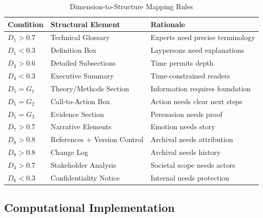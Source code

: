 \begin{table}[htbp]
\centering
\caption{Dimension-to-Structure Mapping Rules}
\label{tab:structure-rules}
\renewcommand{\arraystretch}{1.3}
\begin{tabular}{@{}lll@{}}
\toprule
\textbf{Condition} & \textbf{Structural Element} & \textbf{Rationale} \\
\midrule
$D_1 > 0.7$ & Technical Glossary & Experts need precise terminology \\
$D_1 < 0.3$ & Definition Box & Laypersons need explanations \\
$D_4 > 0.6$ & Detailed Subsections & Time permits depth \\
$D_4 < 0.3$ & Executive Summary & Time-constrained readers \\
$D_5 = G_1$ & Theory/Methods Section & Information requires foundation \\
$D_5 = G_2$ & Call-to-Action Box & Action needs clear next steps \\
$D_5 = G_3$ & Evidence Section & Persuasion needs proof \\
$D_7 > 0.7$ & Narrative Elements & Emotion needs story \\
$D_8 > 0.8$ & References + Version Control & Archival needs attribution \\
$D_8 > 0.8$ & Change Log & Archival needs history \\
$D_3 > 0.7$ & Stakeholder Analysis & Societal scope needs actors \\
$D_6 < 0.3$ & Confidentiality Notice & Internal needs protection \\
\bottomrule
\end{tabular}
\end{table}

\subsection{Computational Implementation}

